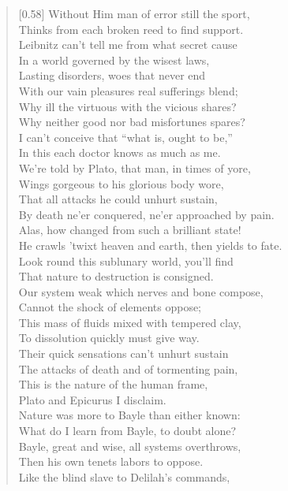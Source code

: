 \begin{verse}[0.58\textwidth]
Without Him man of error still the sport,\\
Thinks from each broken reed to find support.\\
Leibnitz can't tell me from what secret cause\\
In a world governed by the wisest laws,\\
Lasting disorders, woes that never end\\
With our vain pleasures real sufferings blend;\\
Why ill the virtuous with the vicious shares?\\
Why neither good nor bad misfortunes spares?\\
I can't conceive that ``what is, ought to be,''\\
In this each doctor knows as much as me.\\
We're told by Plato, that man, in times of yore,\\
Wings gorgeous to his glorious body wore,\\
That all attacks he could unhurt sustain,\\
By death ne'er conquered, ne'er approached by pain.\\
Alas, how changed from such a brilliant state!\\
He crawls 'twixt heaven and earth, then yields to fate.\\
Look round this sublunary world, you'll find\\
That nature to destruction is consigned.\\
Our system weak which nerves and bone compose,\\
Cannot the shock of elements oppose;\\
This mass of fluids mixed with tempered clay,\\
To dissolution quickly must give way.\\
Their quick sensations can't unhurt sustain\\
The attacks of death and of tormenting pain,\\
This is the nature of the human frame,\\
Plato and Epicurus I disclaim.\\
Nature was more to Bayle than either known:\\
What do I learn from Bayle, to doubt alone?\\
Bayle, great and wise, all systems overthrows,\\
Then his own tenets labors to oppose.\\
Like the blind slave to Delilah's commands,\\

\end{verse}
